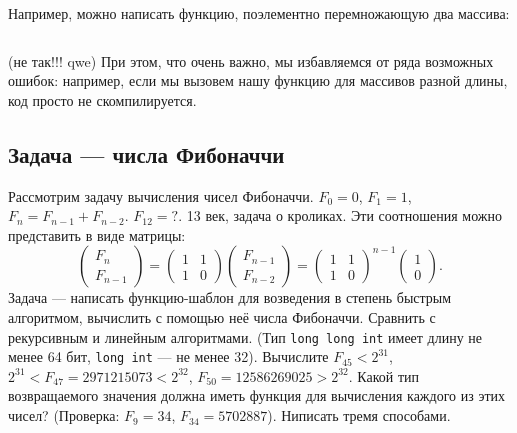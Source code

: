 \documentclass{book}
\begin{document}
\clearpage

Например, можно написать функцию, поэлементно перемножающую два массива:
\inputminted{cpp}{mult-arrays.cpp}
(не так!!! qwe) При этом, что очень важно, мы избавляемся от ряда возможных ошибок: например, если мы вызовем нашу
функцию для массивов разной длины, код просто не скомпилируется.

\subsection{Задача --- числа Фибоначчи}
Рассмотрим задачу вычисления чисел Фибоначчи. $F_0 = 0$, $F_1 = 1$, $F_n = F_{n-1} + F_{n-2}$.
$F_{12} = ?$.
13 век, задача о кроликах. Эти
соотношения можно представить в виде матрицы:
\begin{equation}
    \begin{pmatrix} F_n \\ F_{n-1} \end{pmatrix} = \begin{pmatrix} 1 & 1 \\ 1 & 0 \end{pmatrix}
    \begin{pmatrix} F_{n - 1} \\ F_{n - 2} \end{pmatrix} = \begin{pmatrix} 1 & 1 \\ 1 & 0
\end{pmatrix}^{n - 1} \begin{pmatrix} 1 \\ 0 \end{pmatrix}.
\end{equation}
Задача --- написать функцию-шаблон для возведения в степень быстрым алгоритмом, вычислить с помощью
неё числа Фибоначчи. Сравнить с рекурсивным и линейным алгоритмами. (Тип
\texttt{long long int} имеет длину не менее 64 бит, \texttt{long int} --- не
менее 32). Вычислите $F_{45} < 2^{31}$, $2^{31} < F_{47} = 2971215073 < 2^{32}$, $F_{50} =
12586269025 > 2^{32}$.  Какой тип возвращаемого значения должна иметь функция для вычисления
каждого из этих чисел?  (Проверка: $F_{9} = 34$, $F_{34} = 5702887$). Ниписать тремя способами.
\end{document}
